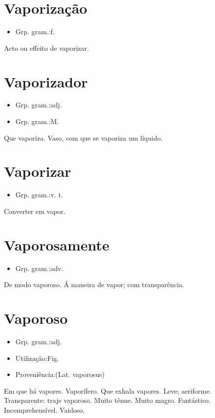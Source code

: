 \documentclass{article}
\begin{document}
\section{Vaporização}
\begin{itemize}
\item {Grp. gram.:f.}
\end{itemize}
Acto ou effeito de vaporizar.
\section{Vaporizador}
\begin{itemize}
\item {Grp. gram.:adj.}
\end{itemize}
\begin{itemize}
\item {Grp. gram.:M.}
\end{itemize}
Que vaporiza.
Vaso, com que se vaporiza um líquido.
\section{Vaporizar}
\begin{itemize}
\item {Grp. gram.:v. t.}
\end{itemize}
Converter em vapor.
\section{Vaporosamente}
\begin{itemize}
\item {Grp. gram.:adv.}
\end{itemize}
De modo vaporoso.
Á maneira de vapor; com transparência.
\section{Vaporoso}
\begin{itemize}
\item {Grp. gram.:adj.}
\end{itemize}
\begin{itemize}
\item {Utilização:Fig.}
\end{itemize}
\begin{itemize}
\item {Proveniência:(Lat. \textunderscore vaporosus\textunderscore )}
\end{itemize}
Em que há vapores.
Vaporífero.
Que exhala vapores.
Leve; aeriforme.
Transparente: \textunderscore traje vaporoso\textunderscore .
Muito tênue.
Muito magro.
Fantástico.
Incomprehensível.
Vaidoso.
\end{document}
